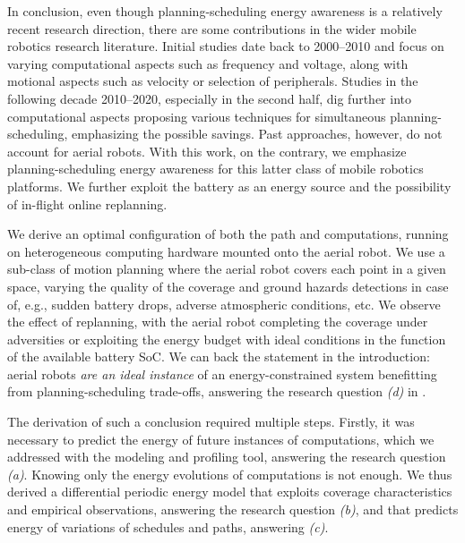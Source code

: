 

In conclusion, even though planning-scheduling energy awareness is a relatively recent research direction, there are some contributions in the wider mobile robotics research literature. Initial studies date back to 2000--2010 and focus on varying computational aspects such as frequency and voltage, along with motional aspects such as velocity or selection of peripherals. Studies in the following decade 2010--2020, especially in the second half, dig further into computational aspects proposing various techniques for simultaneous planning-scheduling, emphasizing the possible savings. Past approaches, however, do not account for aerial robots. With this work, on the contrary, we emphasize planning-scheduling energy awareness for this latter class of mobile robotics platforms. We further exploit the battery as an energy source and the possibility of in-flight online replanning.

We derive an optimal configuration of both the path and computations, running on heterogeneous computing hardware mounted onto the aerial robot. We use a sub-class of motion planning where the aerial robot covers each point in a given space, varying the quality of the coverage and ground hazards detections in case of, e.g., sudden battery drops, adverse atmospheric conditions, etc. We observe the effect of replanning, with the aerial robot completing the coverage under adversities or exploiting the energy budget with ideal conditions in the function of the available battery SoC. We can back the statement in the introduction: aerial robots {\itshape are an ideal instance} of an energy-constrained system benefitting from planning-scheduling trade-offs, answering the research question {\itshape (d)} in . 

The derivation of such a conclusion required multiple steps. Firstly, it was necessary to predict the energy of future instances of computations, which we addressed with the \powprof{} modeling and profiling tool, answering the research question {\itshape (a)}. Knowing only the energy evolutions of computations is not enough. We thus derived a differential periodic energy model that exploits coverage characteristics and empirical observations, answering the research question {\itshape (b)}, and that predicts energy of variations of schedules and paths, answering {\itshape (c)}. 

